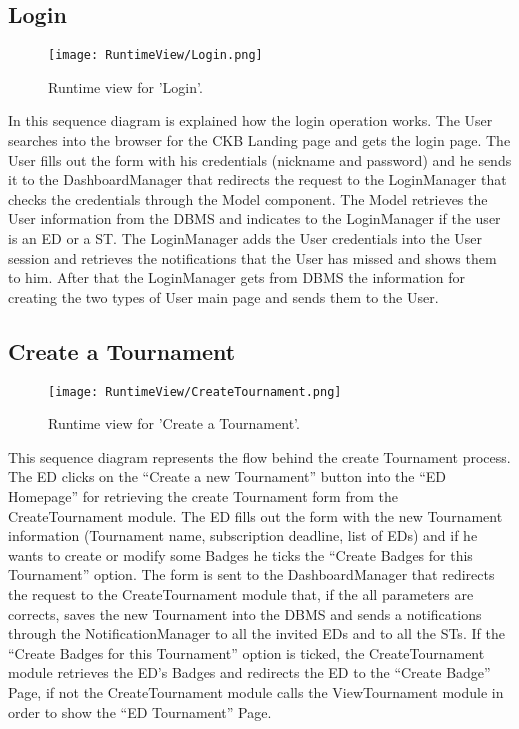 \subsection{Login}
\begin{figure}[H]
    \begin{center}
        \texttt{[image: RuntimeView/Login.png]}
        \caption{Runtime view for 'Login'.}
        \label{fig:runtime_login}%
    \end{center}
\end{figure}
In this sequence diagram is explained how the login operation works.
The User searches into the browser for the CKB Landing page and gets the login page.
The User fills out the form with his credentials (nickname and password) and he sends it to the DashboardManager that redirects the request to the LoginManager that checks the credentials through the Model component.
The Model retrieves the User information from the DBMS and indicates to the LoginManager if the user is an ED or a ST.
The LoginManager adds the User credentials into the User session and retrieves the notifications that the User has missed and shows them to him.
After that the LoginManager gets from DBMS the information for creating the two types of User main page and sends them to the User.


\subsection{Create a Tournament}
\begin{figure}[H]
    \begin{center}
        \texttt{[image: RuntimeView/CreateTournament.png]}
        \caption{Runtime view for 'Create a Tournament'.}
        \label{fig:runtime_createtournament}%
    \end{center}
\end{figure}
This sequence diagram represents the flow behind the create Tournament process.
The ED clicks on the “Create a new Tournament” button into the “ED Homepage” for retrieving the create Tournament form from the CreateTournament module. The ED fills out the form with the new Tournament information (Tournament name, subscription deadline, list of EDs) and if he wants to create or modify some Badges he ticks the “Create Badges for this Tournament” option. The form is sent to the DashboardManager that redirects the request to the CreateTournament module that, if the all parameters are corrects, saves the new Tournament into the DBMS and sends a notifications through the NotificationManager to all the invited EDs and to all the STs.
If the “Create Badges for this Tournament” option is ticked, the  CreateTournament module retrieves the ED’s Badges and redirects the ED to the “Create Badge” Page, if not the CreateTournament module calls the ViewTournament module in order to show the “ED Tournament” Page.


